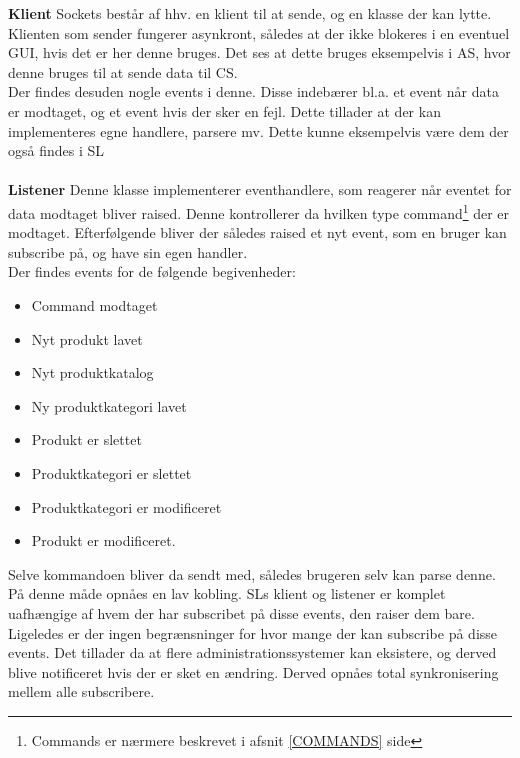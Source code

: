 \textbf{Klient}
Sockets består af hhv. en klient til at sende, og en klasse der kan lytte. Klienten som sender fungerer asynkront, således at der ikke blokeres i en eventuel GUI, hvis det er her denne bruges. Det ses at dette bruges eksempelvis i \gls{AS}, hvor denne bruges til at sende data til \gls{CS}.\\
Der findes desuden nogle events i denne. Disse indebærer bl.a. 	et event når data er modtaget, og et event hvis der sker en fejl. Dette tillader at der kan implementeres egne handlere, parsere mv. Dette kunne eksempelvis være dem der også findes i \gls{SL} \\\\
 

\textbf{Listener}
Denne klasse implementerer eventhandlere, som reagerer når eventet for data modtaget bliver raised. Denne kontrollerer da hvilken type command\footnote{Commands er nærmere beskrevet i afsnit \ref{COMMANDS} side \pageref{COMMANDS}} der er modtaget. Efterfølgende bliver der således raised et nyt event, som en bruger kan subscribe på, og have sin egen handler.\\
Der findes events for de følgende begivenheder:

\begin{itemize}
	\item Command modtaget
	\item Nyt produkt lavet
	\item Nyt produktkatalog
	\item Ny produktkategori lavet
	\item Produkt er slettet
	\item Produktkategori er slettet
	\item Produktkategori er modificeret
	\item Produkt er modificeret.
\end{itemize}

Selve kommandoen bliver da sendt med, således brugeren selv kan parse denne.\\
På denne måde opnåes en lav kobling. \gls{SL}s klient og listener er komplet uafhængige af hvem der har subscribet på disse events, den raiser dem bare. Ligeledes er der ingen begrænsninger for hvor mange der kan subscribe på disse events. Det tillader da at flere administrationssystemer kan eksistere, og derved blive notificeret hvis der er sket en ændring. Derved opnåes total synkronisering mellem alle subscribere.

